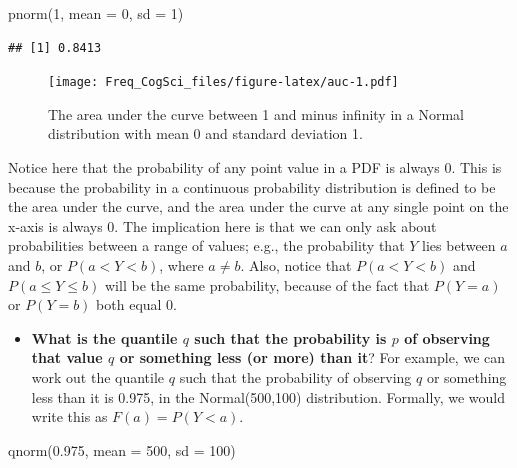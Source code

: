 \documentclass[
  12pt,
]{krantz}
\newenvironment{Shaded}{\begin{snugshade}}{\end{snugshade}}
\newcommand{\AttributeTok}[1]{\textcolor[rgb]{0.77,0.63,0.00}{#1}}
\newcommand{\DecValTok}[1]{\textcolor[rgb]{0.00,0.00,0.81}{#1}}
\newcommand{\FloatTok}[1]{\textcolor[rgb]{0.00,0.00,0.81}{#1}}
\newcommand{\FunctionTok}[1]{\textcolor[rgb]{0.00,0.00,0.00}{#1}}
\newcommand{\NormalTok}[1]{#1}
\providecommand{\tightlist}{%
  \setlength{\itemsep}{0pt}\setlength{\parskip}{0pt}}
\theoremstyle{definition}
\theoremstyle{definition}
\theoremstyle{definition}
\theoremstyle{definition}
\theoremstyle{remark}
\begin{document}
\begin{Shaded}
\begin{Highlighting}[]
\FunctionTok{pnorm}\NormalTok{(}\DecValTok{1}\NormalTok{, }\AttributeTok{mean =} \DecValTok{0}\NormalTok{, }\AttributeTok{sd =} \DecValTok{1}\NormalTok{)}
\end{Highlighting}
\end{Shaded}

\begin{verbatim}
## [1] 0.8413
\end{verbatim}

\begin{figure}
\centering
\texttt{[image: Freq\_CogSci\_files/figure-latex/auc-1.pdf]}
\caption{\label{fig:auc}The area under the curve between 1 and minus infinity in a Normal distribution with mean 0 and standard deviation 1.}
\end{figure}

Notice here that the probability of any point value in a PDF is always 0. This is because the probability in a continuous probability distribution is defined to be the area under the curve, and the area under the curve at any single point on the x-axis is always 0. The implication here is that we can only ask about probabilities between a range of values; e.g., the probability that \(Y\) lies between \(a\) and \(b\), or \(P(a<Y<b)\), where \(a\neq b\). Also, notice that \(P(a<Y<b)\) and \(P(a\leq Y\leq b)\) will be the same probability, because of the fact that \(P(Y=a)\) or \(P(Y=b)\) both equal 0.

\begin{itemize}
\tightlist
\item
  \textbf{What is the quantile \(q\) such that the probability is \(p\) of observing that value \(q\) or something less (or more) than it}? For example, we can work out the quantile \(q\) such that the probability of observing \(q\) or something less than it is 0.975, in the Normal(500,100) distribution. Formally, we would write this as \(F(a)=P(Y<a)\).
\end{itemize}

\begin{Shaded}
\begin{Highlighting}[]
\FunctionTok{qnorm}\NormalTok{(}\FloatTok{0.975}\NormalTok{, }\AttributeTok{mean =} \DecValTok{500}\NormalTok{, }\AttributeTok{sd =} \DecValTok{100}\NormalTok{)}
\end{Highlighting}
\end{Shaded}
\end{document}
